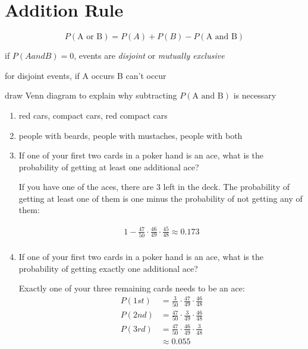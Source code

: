\documentclass[landscape]{exam}
\begin{document}
  \section{Addition Rule}

  \[
    P(\text{A or B}) = P(A) + P(B) - P(\text{A and B})
  \]

  \begin{itemize*}
    \item if $P(A and B) = 0$, events are {\em disjoint} or {\em mutually
      exclusive}
    \item for disjoint events, if A occurs B can't occur
    \item draw Venn diagram to explain why subtracting $P(\text{A and B})$ is
      necessary
  \end{itemize*}

  \begin{enumerate}
    \item red cars, compact cars, red compact cars

    \item people with beards, people with mustaches, people with both

    \item If one of your first two cards in a poker hand is an ace, what is the
      probability of getting at least one additional ace?

      \begin{solution}
        If you have one of the aces, there are 3 left in the deck. The
        probability of getting at least one of them is one minus the probability
        of not getting any of them:

        \begin{align*}
          1 - \frac{47}{50} \cdot \frac{46}{49} \cdot \frac{45}{48} \approx 0.173 \\
        \end{align*}
      \end{solution}

    \item If one of your first two cards in a poker hand is an ace, what is the
      probability of getting exactly one additional ace?

      \begin{solution}
        Exactly one of your three remaining cards needs to be an ace:
        \begin{align*}
          P(1st) & = \frac{3}{50} \cdot \frac{47}{49} \cdot \frac{46}{48} \\
          P(2nd) & = \frac{47}{50} \cdot \frac{3}{49} \cdot \frac{46}{48} \\
          P(3rd) & = \frac{47}{50} \cdot \frac{46}{49} \cdot \frac{3}{48} \\
                 & \approx 0.055
        \end{align*}


\end{solution}
\end{enumerate}
\end{document}
